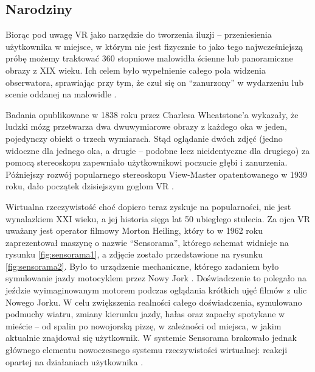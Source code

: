 \subsection{Narodziny}

Biorąc pod uwagę VR jako narzędzie do tworzenia iluzji – przeniesienia użytkownika w miejsce, w którym nie jest fizycznie to jako tego najwcześniejszą próbę możemy traktować 360 stopniowe malowidła ścienne lub panoramiczne obrazy z XIX wieku. Ich celem było wypełnienie całego pola widzenia obserwatora, sprawiając przy tym, że czuł się on ``zanurzony'' w wydarzeniu lub scenie oddanej na malowidle \citep{interactivemedia}.

Badania opublikowane w 1838 roku przez Charlesa Wheatstone’a wykazały, że ludzki mózg przetwarza dwa dwuwymiarowe obrazy z każdego oka w jeden, pojedynczy obiekt o trzech wymiarach. Stąd oglądanie dwóch zdjęć (jedno widoczne dla jednego oka, a drugie – podobne lecz nieidentyczne dla drugiego) za pomocą stereoskopu zapewniało użytkownikowi poczucie głębi i zanurzenia. Późniejszy rozwój popularnego stereoskopu View-Master opatentowanego w 1939 roku, dało początek dzisiejszym goglom VR \citep{interactivemedia}.

Wirtualna rzeczywistość choć dopiero teraz zyskuje na popularności, nie jest wynalazkiem XXI wieku, a jej historia sięga lat 50 ubiegłego stulecia. Za ojca VR uważany jest operator filmowy Morton Heiling, który to w 1962 roku zaprezentował maszynę o nazwie ``Sensorama'', którego schemat widnieje na rysunku \ref{fig:sensorama1}, a zdjęcie zostało przedstawione na rysunku \ref{fig:sensorama2}.  Było to urządzenie mechaniczne, którego zadaniem było symulowanie jazdy motocyklem przez Nowy Jork \citep{determinants}. Doświadczenie to polegało na jeździe wyimaginowanym motorem podczas oglądania krótkich ujęć filmów z ulic Nowego Jorku. W celu zwiększenia realności całego doświadczenia, symulowano podmuchy wiatru, zmiany kierunku jazdy, hałas oraz zapachy spotykane w mieście – od spalin po nowojorską pizzę, w zależności od miejsca, w jakim aktualnie znajdował się użytkownik. W systemie Sensorama brakowało jednak głównego elementu nowoczesnego systemu rzeczywistości wirtualnej: reakcji opartej na działaniach użytkownika \citep{virtualdev}.


